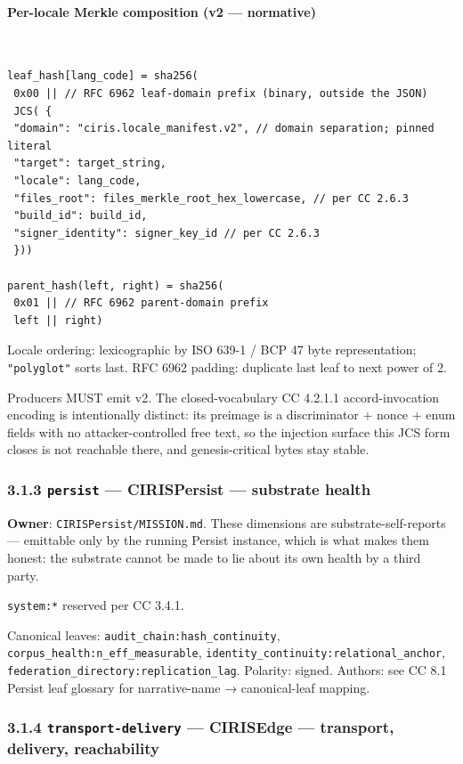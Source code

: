 \documentclass[11pt]{article}
\begin{document}
\paragraph{Per-locale Merkle composition (v2 — normative)}\mbox{}\\


\begin{lstlisting}
leaf_hash[lang_code] = sha256(
 0x00 || // RFC 6962 leaf-domain prefix (binary, outside the JSON)
 JCS( {
 "domain": "ciris.locale_manifest.v2", // domain separation; pinned literal
 "target": target_string,
 "locale": lang_code,
 "files_root": files_merkle_root_hex_lowercase, // per CC 2.6.3
 "build_id": build_id,
 "signer_identity": signer_key_id // per CC 2.6.3
 }))

parent_hash(left, right) = sha256(
 0x01 || // RFC 6962 parent-domain prefix
 left || right)
\end{lstlisting}

Locale ordering: lexicographic by ISO 639-1 / BCP 47 byte representation; \texttt{"polyglot"} sorts last. RFC 6962 padding: duplicate last leaf to next power of 2.


Producers MUST emit v2. The closed-vocabulary CC 4.2.1.1 accord-invocation encoding is intentionally distinct: its preimage is a discriminator + nonce + enum fields with no attacker-controlled free text, so the injection surface this JCS form closes is not reachable there, and genesis-critical bytes stay stable.


\subsubsection*{3.1.3 \texttt{persist} — CIRISPersist — substrate health}


\textbf{Owner}: \texttt{CIRISPersist/MISSION.md}. These dimensions are substrate-self-reports — emittable only by the running Persist instance, which is what makes them honest: the substrate cannot be made to lie about its own health by a third party.


\texttt{system:*} reserved per CC 3.4.1.


Canonical leaves: \texttt{audit\_chain:hash\_continuity}, \texttt{corpus\_health:n\_eff\_measurable}, \texttt{identity\_continuity:relational\_anchor}, \texttt{federation\_directory:replication\_lag}. Polarity: signed. Authors: see CC 8.1 Persist leaf glossary for narrative-name → canonical-leaf mapping.


\subsubsection*{3.1.4 \texttt{transport-delivery} — CIRISEdge — transport, delivery, reachability}
\end{document}
